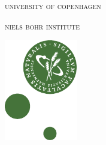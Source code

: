 \begin{titlingpage}
{
\thispagestyle{empty}
\newlength{\topma}\setlength{\topma}{-1in}\addtolength{\topma}{-\headsep}\addtolength{\topma}{-\voffset}\addtolength{\topma}{11mm}
\newlength{\sidema}\setlength{\sidema}{-1in}\addtolength{\sidema}{-\hoffset}\addtolength{\sidema}{-\oddsidemargin}\addtolength{\sidema}{-\marginparsep}\addtolength{\sidema}{15mm}
\newlength{\textwa}\setlength{\textwa}{\paperwidth}\addtolength{\textwa}{-35mm}\addtolength{\textwa}{-\textwidth}
\newlength{\textha}\setlength{\textha}{-\textheight}\addtolength{\textha}{\paperheight}\addtolength{\textha}{-11mm}\addtolength{\textha}{-.1\paperheight}
\changepage{\textha}{\textwa}{}{\sidema}{}{-\topmargin}{-\headheight}{\topma}{}
\noindent\begin{minipage}[t]{.8\textwidth}
\noindent\raggedright \textcolor{kugray}{\fontsize{18}{17}\selectfont\textsc{university of copenhagen}}

\vspace{.2em}\textcolor{kugray}{\fontsize{15}{17}\selectfont\textsc{niels bohr institute}}
\end{minipage}\hfill\begin{minipage}[t]{32mm}\raggedleft \vspace{16mm} \includegraphics[height=44mm]{figures/bionat.pdf}
\end{minipage}


}
\end{titlingpage}
